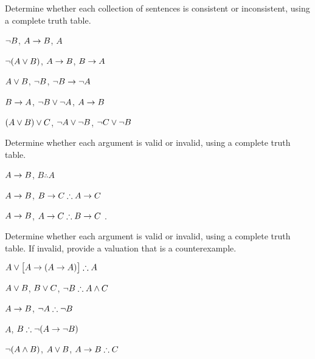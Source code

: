 \begin{practiceproblems}
\problempart
\label{pr.TT.satisfiable2}

\noindent\problempart
\label{pr.TT.satisfiable3}
Determine whether each collection of sentences is consistent or inconsistent, using a complete truth table.
\begin{earg}
\item $\neg B$, $A \rightarrow B$, $A$ \vspace{.5ex} \hfill {}
\item $\neg(A \vee B)$, $A \rightarrow B$, $B \rightarrow A$\vspace{.5ex} \hfill {}
\item $A \vee B$, $\neg B$, $\neg B \rightarrow \neg A$\vspace{.5ex} \hfill {}
\item $B \rightarrow A$, $\neg B \vee \neg A$, $A \rightarrow B$\vspace{.5ex} \hfill {} 
\item $(A \vee B) \vee C$, $\neg A \vee \neg B$, $\neg C \vee \neg B$\vspace{.5ex} \hfill {}
\end{earg}

\noindent\problempart
\label{pr.TT.valid2}
Determine whether each argument is valid or invalid, using a complete truth table.
\begin{earg}
\item $A\rightarrow B$, $B \therefore  A$ \hfill {}

\item $A\rightarrow B$, $B\eif C \therefore A\eif C$ \hfill {}

\item $A \rightarrow B$, $A \eif C\therefore B \eif C$ \hfill {}.

\end{earg}

\noindent\problempart
\label{pr.TT.valid3}
Determine whether each argument is valid or invalid, using a complete truth table. If invalid, provide a valuation that is a counterexample.
\begin{earg}
\item $A\eor\bigl[A\eif(A\eif A)\bigr] \therefore  A $\vspace{.5ex} \hfill {}
\item $A\vee B$, $B\vee C$, $\enot B \therefore A \eand C$\vspace{.5ex} \hfill {}
\item $A \rightarrow B$, $\enot A\therefore \enot B$ \vspace{.5ex} \hfill {}
\item $A$, $B\therefore \enot(A\eif \enot B)$ \vspace{.5ex} \hfill {}
\item $\neg(A \mathbin{\wedge} B)$, $A \vee B$, $A \eif B\therefore C$ \vspace{.5ex} \hfill {}
\end{earg}


\end{practiceproblems}
